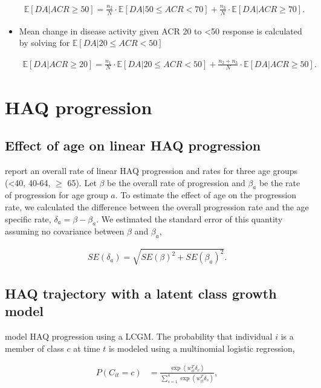 \documentclass[11pt,final,fleqn]{article}\usepackage[]{graphicx}\usepackage[]{color}
\theoremstyle{plain}
\newcommand\E{\mathbb{E}}
\begin{document}
\begin{appendices}
\begin{itemize}
\begin{align}
\E[DA|ACR \geq 50] = \frac{n_2}{N} \cdot \E[DA|50 \leq ACR < 70]  + \frac{n_3}{N} \cdot \E[DA|ACR \geq 70].
\end{align}

\item Mean change in disease activity given ACR 20 to <50 response is calculated by solving for $\E[DA|20 \leq ACR < 50]$

\begin{align}
\E[DA|ACR \geq 20] = \frac{n_1}{N} \cdot \E[DA|20 \leq ACR < 50]  + \frac{n_2 + n_3}{N} \cdot \E[DA|ACR \geq 50].
\end{align}

\end{itemize}

\section{HAQ progression}\label{app:haq-progression}
\subsection{Effect of age on linear HAQ progression}\label{app:age-linear-haq}
\citet{michaud2011treatment} report an overall rate of linear HAQ progression and rates for three age groups (<40, 40-64, $\geq$ 65). Let $\beta$ be the overall rate of progression and $\beta_a$ be the rate of progression for age group $a$. To estimate the effect of age on the progression rate, we calculated the difference between the overall progression rate and the age specific rate, $\delta_a = \beta - \beta_a$. We estimated the standard error of this quantity assuming no covariance between $\beta$ and $\beta_a$,

\begin{align}
SE(\delta_a) = \sqrt{SE(\beta)^2 + SE(\beta_a)^2}.
\end{align}


\subsection{HAQ trajectory with a latent class growth model}\label{app:lcgm-haq}
\citet{norton2014health} model HAQ progression using a LCGM. The probability that individual $i$ is a member of class $c$ at time $t$ is modeled using a multinomial logistic regression,

\begin{align}
P(C_{it} = c) &= \frac{\exp(w_{it}^T\delta_c)}{\sum_{s=1}^{4}\exp(w_{it}^T\delta_s)},
\end{align}


\end{appendices}
\end{document}

